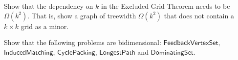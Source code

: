 \begin{exercise}[\easy]
Show that the dependency on $k$ in the Excluded Grid Theorem needs to be $\Omega(k^2)$. That is, show a graph of treewidth $\Omega(k^2)$ that does not contain a $k \times k$ grid as a minor.
\end{exercise}

\begin{exercise}
Show that the following problems are bidimensional: $\mathsf{FeedbackVertexSet}$, $\mathsf{InducedMatching}$, $\mathsf{CyclePacking}$, $\mathsf{LongestPath}$ and $\mathsf{DominatingSet}$.
\end{exercise}


